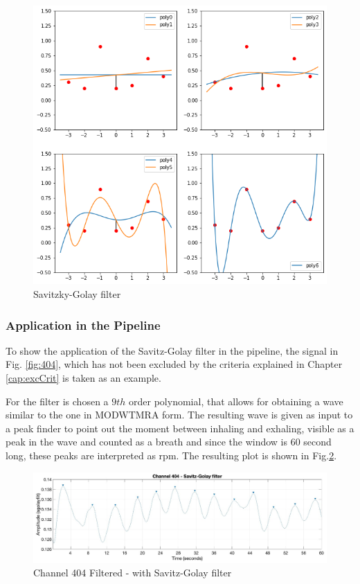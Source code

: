 \begin{figure}[p]
    \centering
    \includegraphics[width=\textwidth]{img/sg_expl.png}
    \caption{Savitzky-Golay filter}
    \label{fig:4sg explain}
\end{figure}
\clearpage



\subsubsection{Application in the Pipeline}

To show the application of the Savitz-Golay filter in the pipeline, the signal in Fig. \ref{fig:404}, which has not been excluded by the criteria explained in Chapter \ref{cap:excCrit} is taken as an example.

For the filter is chosen a $9th$ order polynomial, that allows for obtaining a wave similar to the one in MODWTMRA form.
The resulting wave is given as input to a peak finder to point out the moment between inhaling and exhaling, visible as a peak in the wave and counted as a breath and since the window is 60 second long, these peaks are interpreted as rpm. The resulting plot is shown in Fig.\ref{fig:404sg}.

\vspace*{0.5cm}

\begin{figure}[H]
    \centering
    \includegraphics[width=\textwidth]{img/404sg.jpg}
    \caption{Channel 404 Filtered - with Savitz-Golay filter}
    \label{fig:404sg}
\end{figure}


